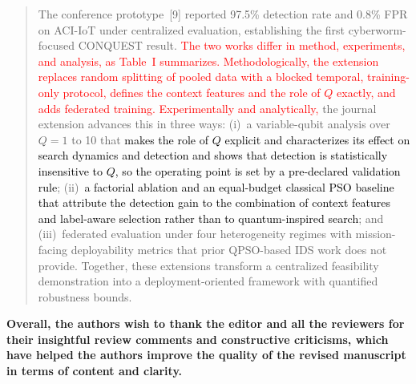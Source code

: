 \documentclass[11pt]{article}
\newenvironment{excerpt}{\begin{quote}\sloppy}{\end{quote}}
\begin{document}
\begin{excerpt}
The conference prototype~{[9]} reported
97.5\% detection rate and 0.8\% FPR on ACI-IoT under
centralized evaluation, establishing the first
cyberworm-focused CONQUEST result. \textcolor{red}{The
two works differ in method, experiments, and analysis,
as Table~I summarizes. Methodologically, the extension
replaces random splitting of pooled data with a blocked temporal,
training-only protocol, defines the context features and the role
of $Q$ exactly, and adds federated training. Experimentally and
analytically,} the journal extension
advances this in three ways: (i)~a
variable-qubit analysis over $Q=1$ to 10
that \textcolor{black}{makes the role of $Q$ explicit and
characterizes its effect on search dynamics and detection}
\textcolor{black}{and shows that detection is statistically
insensitive to $Q$, so the operating point is set by a pre-declared
validation rule}; (ii)~\textcolor{black}{a factorial ablation
and an equal-budget classical PSO baseline that attribute the
detection gain to the combination of context features and
label-aware selection rather than to quantum-inspired search};
and (iii)~federated
evaluation under four heterogeneity regimes with
mission-facing deployability metrics that prior
QPSO-based IDS work does not provide. Together, these
extensions transform a centralized feasibility demonstration
into a deployment-oriented framework with quantified
robustness bounds.
\end{excerpt}

\bigskip
\noindent\textbf{Overall, the authors wish to thank the editor and all the
reviewers for their insightful review comments and constructive criticisms,
which have helped the authors improve the quality of the revised manuscript
in terms of content and clarity.}
\end{document}
